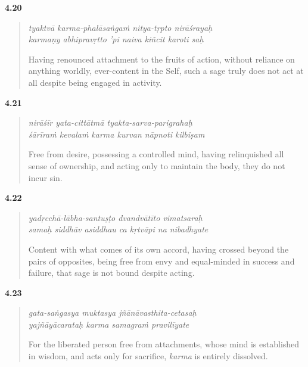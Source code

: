 \par\noindent\textbf{4.20}\par
\begin{verse}
\textit{tyaktvā karma-phalāsaṅgaṁ nitya-tṛpto nirāśrayaḥ} \\
\textit{karmaṇy abhipravṛtto ’pi naiva kiñcit karoti saḥ}

\noindent Having renounced attachment to the fruits of action, without reliance on anything worldly, ever-content in the Self, such a sage truly does not act at all despite being engaged in activity.
\end{verse}
\par



\par\noindent\textbf{4.21}\par
\begin{verse}
\textit{nirāśīr yata-cittātmā tyakta-sarva-parigrahaḥ} \\
\textit{śārīraṁ kevalaṁ karma kurvan nāpnoti kilbiṣam}

\noindent Free from desire, possessing a controlled mind, having relinquished all sense of ownership, and acting only to maintain the body, they do not incur sin.
\end{verse}
\par



\par\noindent\textbf{4.22}\par
\begin{verse}
\textit{yadṛcchā-lābha-santuṣṭo dvandvātīto vimatsaraḥ} \\
\textit{samaḥ siddhāv asiddhau ca kṛtvāpi na nibadhyate}

\noindent Content with what comes of its own accord, having crossed beyond the pairs of opposites, being free from envy and equal-minded in success and failure, that sage is not bound despite acting.
\end{verse}
\par



\par\noindent\textbf{4.23}\par
\begin{verse}
\textit{gata-saṅgasya muktasya jñānāvasthita-cetasaḥ} \\
\textit{yajñāyācarataḥ karma samagraṁ pravilīyate}

\noindent For the liberated person free from attachments, whose mind is established in wisdom, and acts only for sacrifice, \textit{karma} is entirely dissolved.
\end{verse}
\par


